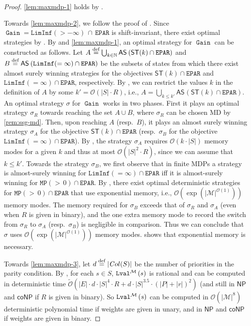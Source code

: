 \documentclass[a4paper,UKenglish,cleveref,autoref,thm-restate]{lipics-v2021}
\DeclareMathOperator{\Gain}{\mathtt{Gain}}
\newcommand{\Eparity}{\mathtt{EPAR}}
\newcommand{\LimInf}[2]{\mathtt{LimInf}(#1 #2)}
\newcommand{\MP}[2]{\mathtt{MP}(#1\, #2)}
\newcommand{\+}[1]{\mathbb{#1}}
\newcommand{\?}[1]{\mathcal{#1}}
\newcommand{\N}{\+{N}}
\newcommand{\Ocompl}{\?{O}}
\newcommand{\eqby}[2][=]{\stackrel{\text{{\tiny{#2}}}}{#1}}
\newcommand{\eqdef}{\eqby{def}}
\newcommand{\NP}{\ensuremath{\mathsf{NP}}}
\newcommand{\coNP}{\ensuremath{\mathsf{coNP}}}
\newcommand{\mdp}{{\mathcal M}}
\newcommand{\states}{S}
\newcommand{\s}{s}
\newcommand{\zstrat}{\sigma}
\newcommand{\coloring}{{\mathit{C}ol}}
\newcommand{\ES}[1]{\mathsf{ST}(#1)}
\newcommand{\AS}[2][]{\mathsf{AS}^{#1}\left(#2\right)}
\begin{document}
\begin{proof}
  \cref{lem:maxmdp-1} holds by \cite[Lemma 30]{MSTW2021}.

  Towards \cref{lem:maxmdp-2}, we follow the proof of \cite[Lemma 16]{MSTW2021}.
  Since $\Gain = \LimInf{>}{-\infty}\, \cap\, \Eparity$ is shift-invariant,
  there exist optimal strategies by \cite{GH2010}.
  By \cite[Theorem 18]{MSTW2017} and \cref{lem:maxmdp-1}, an optimal strategy
  for $\Gain$ can be constructed as follows.
  Let $A\eqdef\bigcup_{k\in\N}\AS{\ES{k}\cap\Eparity}$
  and $B\eqdef\AS{\LimInf{=}{\infty}\cap\Eparity}$
  be the subsets of states from which there exist almost surely winning
  strategies for the objectives $\ES{k}\cap\Eparity$ and
  $\LimInf{=}{\infty}\cap\Eparity$, respectively.
  By \cite[Theorem 8]{MSTW2017}, we can restrict the values $k$ in the
  definition of $A$ by some $k' = \Ocompl(|\states|\cdot R)$, i.e.,
  $A = \bigcup_{k \le k'}\AS{\ES{k}\cap\Eparity}$.
  An optimal strategy $\zstrat$ for $\Gain$ works in two phases.
  First it plays an optimal strategy $\zstrat_R$ towards reaching the set $A \cup B$,
  where $\zstrat_R$ can be chosen MD by \cref{rem:ssg-md}.
  Then, upon reaching $A$ (resp.\ $B$), it plays an almost surely winning
  strategy $\zstrat_A$ for the objective $\ES{k}\cap\Eparity$
  (resp.\ $\zstrat_B$ for the objective $\LimInf{=}{\infty}\cap\Eparity$).
  By \cite[Theorem 8]{MSTW2017},
  the strategy $\zstrat_A$ requires $\Ocompl(k\cdot |\states|)$ memory modes
  for a given $k$ and thus at most $\Ocompl(|\states|^2 \cdot R)$, since we
  can assume that $k \le k'$.
  Towards the strategy $\zstrat_B$, we first observe that
  in finite MDPs a strategy is almost-surely winning for $\LimInf{=}{\infty}\cap\Eparity$
  iff it is almost-surely winning for $\MP{>}{0}\cap\Eparity$.
  By \cite[Proposition 4]{Gimbert2011ComputingOS}, there exist optimal
  deterministic strategies for $\MP{>}{0}\cap\Eparity$ that use exponential
  memory, i.e., $\Ocompl(\exp(|\mdp|^{\Ocompl(1)}))$ memory modes.
  The memory required for $\zstrat_B$ exceeds that of $\zstrat_R$ and
  $\zstrat_A$ (even when $R$ is given in binary), and the one extra memory mode to
  record the switch from $\zstrat_R$ to $\zstrat_A$ (resp.\ $\zstrat_B$) is
  negligible in comparison. 
  Thus we can conclude that $\zstrat$ uses $\Ocompl(\exp(|\mdp|^{\Ocompl(1)}))$ memory modes.
  \cite[Fig.~1 and Prop.~4]{Gimbert2011ComputingOS} shows that exponential memory is necessary.
  
  Towards \cref{lem:maxmdp-3}, let $d \eqdef |\coloring(\states)|$ be the
  number of priorities in the parity condition.
  By \cite[Lemma 26]{MSTW2017}, for each $\s \in \states$,
  $\limval[\mdp]{\s}$ is rational and can be computed in deterministic time
  $\tilde{\?O}(|E| \cdot d \cdot |\states|^4 \cdot R + d \cdot |\states|^{3.5} \cdot (|P| + |r|)^2)$
  (and still in $\NP$ and $\coNP$ if $R$ is given in binary).
  So $\limval[\mdp]{\s}$ can be computed in $\Ocompl(|\mdp|^8)$ deterministic
  polynomial time if weights are given in unary, and in $\NP$ and $\coNP$ if
  weights are given in binary.
\end{proof}  
\end{document}
